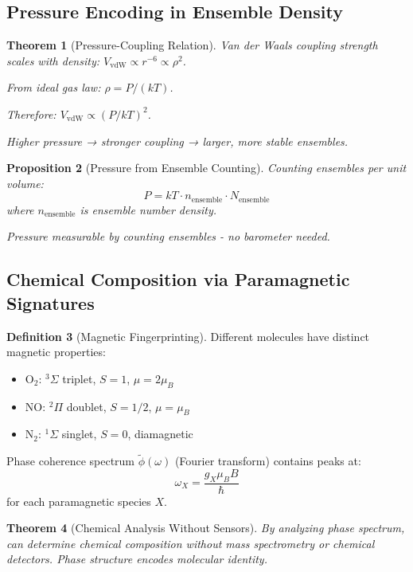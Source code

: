 \documentclass[11pt,a4paper]{article}
\newtheorem{theorem}{Theorem}[section]
\newtheorem{proposition}[theorem]{Proposition}
\theoremstyle{definition}
\newtheorem{definition}[theorem]{Definition}
\theoremstyle{remark}
\begin{document}
\subsection{Pressure Encoding in Ensemble Density}

\begin{theorem}[Pressure-Coupling Relation]
Van der Waals coupling strength scales with density: $V_{\text{vdW}} \propto r^{-6} \propto \rho^2$.

From ideal gas law: $\rho = P/(kT)$.

Therefore: $V_{\text{vdW}} \propto (P/kT)^2$.

Higher pressure → stronger coupling → larger, more stable ensembles.
\end{theorem}

\begin{proposition}[Pressure from Ensemble Counting]
Counting ensembles per unit volume:
\begin{equation}
P = kT \cdot n_{\text{ensemble}} \cdot N_{\text{ensemble}}
\end{equation}
where $n_{\text{ensemble}}$ is ensemble number density.

Pressure measurable by counting ensembles - no barometer needed.
\end{proposition}

\subsection{Chemical Composition via Paramagnetic Signatures}

\begin{definition}[Magnetic Fingerprinting]
Different molecules have distinct magnetic properties:
\begin{itemize}
\item O$_2$: $^3\Sigma$ triplet, $S=1$, $\mu = 2\mu_B$
\item NO: $^2\Pi$ doublet, $S=1/2$, $\mu = \mu_B$
\item N$_2$: $^1\Sigma$ singlet, $S=0$, diamagnetic
\end{itemize}

Phase coherence spectrum $\tilde{\phi}(\omega)$ (Fourier transform) contains peaks at:
\begin{equation}
\omega_X = \frac{g_X \mu_B B}{\hbar}
\end{equation}
for each paramagnetic species $X$.
\end{definition}

\begin{theorem}[Chemical Analysis Without Sensors]
By analyzing phase spectrum, can determine chemical composition without mass spectrometry or chemical detectors. Phase structure encodes molecular identity.
\end{theorem}
\end{document}
